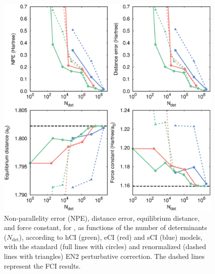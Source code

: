 \documentclass[aip,jcp,preprint,noshowkeys,superscriptaddress]{revtex4-1}
\newcommand{\Ndet}{N_\text{det}}
\begin{document}
\begin{figure}%
\includegraphics[width=1.0\linewidth]{plot_pt2_rpt2_H8}
\caption{
Non-parallelity error (NPE), distance error, equilibrium distance, and force constant, for ,
as functions of the number of determinants ($\Ndet$), according to hCI (green), eCI (red) and sCI (blue) models,
with the standard (full lines with circles) and renormalized (dashed lines with triangles) EN2 perturbative correction.
The dashed lines represent the FCI results.}
\label{fig:plot_pt2_rpt2_h8}
\end{figure}

\clearpage


\end{document}
